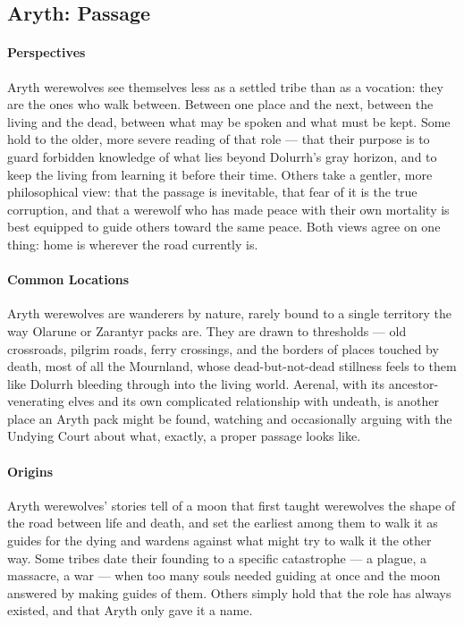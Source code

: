 \documentclass[twocolumn]{dndbook}
\begin{document}
\subsection*{Aryth: Passage}

\paragraph*{Perspectives} Aryth werewolves see themselves less as a settled tribe than as a vocation: they are the ones who walk between.
Between one place and the next, between the living and the dead, between what may be spoken and what must be kept.
Some hold to the older, more severe reading of that role --- that their purpose is to guard forbidden knowledge of what lies beyond Dolurrh's gray horizon, and to keep the living from learning it before their time.
Others take a gentler, more philosophical view: that the passage is inevitable, that fear of it is the true corruption, and that a werewolf who has made peace with their own mortality is best equipped to guide others toward the same peace.
Both views agree on one thing: home is wherever the road currently is.\par

\paragraph*{Common Locations} Aryth werewolves are wanderers by nature, rarely bound to a single territory the way Olarune or Zarantyr packs are.
They are drawn to thresholds --- old crossroads, pilgrim roads, ferry crossings, and the borders of places touched by death, most of all the Mournland, whose dead-but-not-dead stillness feels to them like Dolurrh bleeding through into the living world.
Aerenal, with its ancestor-venerating elves and its own complicated relationship with undeath, is another place an Aryth pack might be found, watching and occasionally arguing with the Undying Court about what, exactly, a proper passage looks like.\par

\paragraph*{Origins} Aryth werewolves' stories tell of a moon that first taught werewolves the shape of the road between life and death, and set the earliest among them to walk it as guides for the dying and wardens against what might try to walk it the other way.
Some tribes date their founding to a specific catastrophe --- a plague, a massacre, a war --- when too many souls needed guiding at once and the moon answered by making guides of them.
Others simply hold that the role has always existed, and that Aryth only gave it a name.\par
\end{document}
